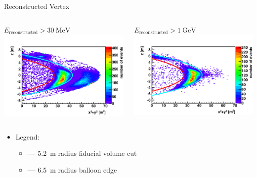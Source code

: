 \documentclass[14pt]{beamer}
\begin{document}
\begin{frame}{Reconstructed Vertex}
	\begin{columns}[T]
		\begin{block}{\centering$E_{\text{reconstructed}} >
			\SI{30}{\mega\electronvolt}$}
			\centering
			\includegraphics[width=\linewidth]{kat_vertex_min30mev.pdf}
		\end{block}
		\begin{block}{\centering$E_{\text{reconstructed}} >
			\SI{1}{\giga\electronvolt}$}
			\centering
			\includegraphics[width=\linewidth]{kat_vertex_min1gev.pdf}
		\end{block}
	\end{columns}
	\begin{itemize}
		\item[] Legend:
			\begin{itemize}
				\item[] {\color{red}\textbf{---}} \SI{5.2}{\meter} radius
					fiducial volume cut
				\item[] {\color{cyan}\textbf{---}} \SI{6.5}{\meter} radius
					balloon edge
			\end{itemize}
	\end{itemize}
\end{frame}
\end{document}
